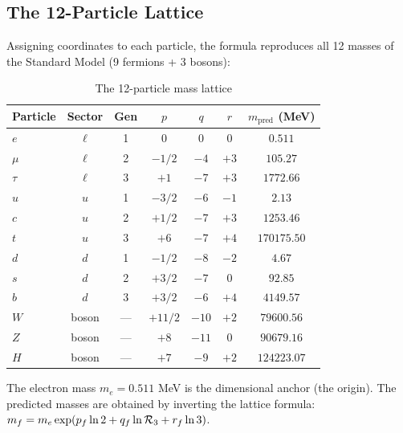 \subsection{The 12-Particle Lattice}\label{sec:12_particle_lattice}

Assigning coordinates to each particle, the formula reproduces all 12 masses of the Standard Model (9 fermions + 3 bosons):

\begin{table}[h]
\centering
\caption{The 12-particle mass lattice}
\label{tab:12_particle_lattice}
\begin{tabular}{lcccccc}
\hline\hline
Particle & Sector & Gen & $p$ & $q$ & $r$ & $m_{\mathrm{pred}}$ (MeV) \\
\hline
$e$ & $\ell$ & 1 & $0$ & $0$ & $0$ & $0.511$ \\
$\mu$ & $\ell$ & 2 & $-1/2$ & $-4$ & $+3$ & $105.27$ \\
$\tau$ & $\ell$ & 3 & $+1$ & $-7$ & $+3$ & $1772.66$ \\
$u$ & $u$ & 1 & $-3/2$ & $-6$ & $-1$ & $2.13$ \\
$c$ & $u$ & 2 & $+1/2$ & $-7$ & $+3$ & $1253.46$ \\
$t$ & $u$ & 3 & $+6$ & $-7$ & $+4$ & $170175.50$ \\
$d$ & $d$ & 1 & $-1/2$ & $-8$ & $-2$ & $4.67$ \\
$s$ & $d$ & 2 & $+3/2$ & $-7$ & $0$ & $92.85$ \\
$b$ & $d$ & 3 & $+3/2$ & $-6$ & $+4$ & $4149.57$ \\
$W$ & boson & --- & $+11/2$ & $-10$ & $+2$ & $79600.56$ \\
$Z$ & boson & --- & $+8$ & $-11$ & $0$ & $90679.16$ \\
$H$ & boson & --- & $+7$ & $-9$ & $+2$ & $124223.07$ \\
\hline\hline
\end{tabular}
\end{table}

The electron mass $m_e = 0.511$ MeV is the dimensional anchor (the origin). The predicted masses are obtained by inverting the lattice formula: $m_f = m_e \exp(p_f \ln 2 + q_f \ln\mathcal{R}_3 + r_f \ln 3)$.

